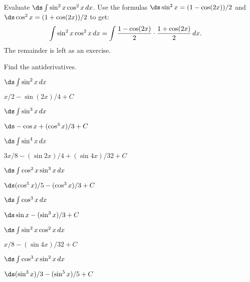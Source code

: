 \begin{example}
Evaluate $\ds\int \sin^2x\cos^2x\,dx$. 
Use the formulas
$\ds \sin^2x =(1-\cos(2x))/2$ and $\ds \cos^2x =(1+\cos(2x))/2$ to get:
$$
  \int \sin^2x\cos^2x\,dx=\int {1-\cos(2x)\over2}\cdot
  {1+\cos(2x)\over2}\,dx.
$$
The remainder is left as an exercise.
\end{example}

\begin{exercises}

Find the antiderivatives.

\twocol

\begin{exercise} $\ds\int \sin^2 x\,dx$
\begin{answer} $x/2-\sin(2x)/4+C$
\end{answer}\end{exercise}

\begin{exercise} $\ds\int \sin^3 x\,dx$
\begin{answer} $\ds -\cos x+(\cos^3x)/3+C$
\end{answer}\end{exercise}

\begin{exercise} $\ds\int \sin^4 x\,dx$
\begin{answer} $3x/8-(\sin 2x)/4+(\sin 4x)/32+C$
\end{answer}\end{exercise}

\begin{exercise} $\ds\int \cos^2 x\sin^3 x\,dx$
\begin{answer} $\ds (\cos^5 x)/5-(\cos^3x)/3+C$
\end{answer}\end{exercise}

\begin{exercise} $\ds\int \cos^3 x\,dx$
\begin{answer} $\ds \sin x-(\sin^3x)/3+C$
\end{answer}\end{exercise}

\begin{exercise} $\ds\int \sin^2 x\cos^2 x\,dx$
\begin{answer} $x/8-(\sin 4x)/32+C$
\end{answer}\end{exercise}

\begin{exercise} $\ds\int \cos^3 x \sin^2 x\,dx$
\begin{answer} $\ds (\sin^3x)/3-(\sin^5x)/5+C$
\end{answer}\end{exercise}


\end{exercises}
